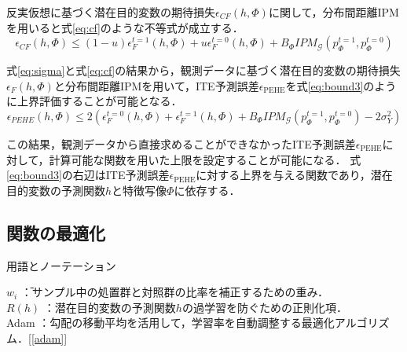 \documentclass[dvipdfmx]{jreport}
\begin{document}
反実仮想に基づく潜在目的変数の期待損失$\epsilon_{CF}(h, \Phi)$に関して，分布間距離IPMを用いると式\eqref{eq:cf}のような不等式が成立する．
\begin{equation}
    \epsilon_{CF}(h, \Phi) \leq (1 - u)\epsilon_F^{t=1}(h, \Phi) + u\epsilon_F^{t=0}(h, \Phi) + B_\Phi IPM_{\mathcal{G}}(p_\Phi^{t=1}, p_\Phi^{t=0}) \label{eq:cf}
\end{equation}


式\eqref{eq:sigma}と式\eqref{eq:cf}の結果から，観測データに基づく潜在目的変数の期待損失$\epsilon_F(h, \Phi)$と分布間距離IPMを用いて，ITE予測誤差$\epsilon_{\text{PEHE}}$を式\eqref{eq:bound3}のように上界評価することが可能となる．
\begin{equation}
    \epsilon_{PEHE}(h, \Phi)
    \leq 2 (\epsilon_F^{t=0}(h, \Phi) + \epsilon_F^{t=1}(h, \Phi) 
    + B_\Phi IPM_{\mathcal{G}}(p_\Phi^{t=1}, p_\Phi^{t=0}) - 2 \sigma_Y^2) \label{eq:bound3} 
\end{equation}

この結果，観測データから直接求めることができなかったITE予測誤差$\epsilon_{\text{PEHE}}$に対して，計算可能な関数を用いた上限を設定することが可能になる．
式\eqref{eq:bound3}の右辺はITE予測誤差$\epsilon_{\text{PEHE}}$に対する上界を与える関数であり，潜在目的変数の予測関数$h$と特徴写像$\Phi$に依存する．



\subsection{関数の最適化}
\begin{itembox}[l]{\large{用語とノーテーション}}
    \begin{tabbing}
        \hspace{15pt} \raisebox{0.5ex}{\tiny $\bullet$} $w_i$ \hspace{14pt}\=：サンプル中の処置群と対照群の比率を補正するための重み．\\[0.5em]
        \hspace{15pt} \raisebox{0.5ex}{\tiny $\bullet$} $R(h)$ \>：潜在目的変数の予測関数$h$の過学習を防ぐための正則化項．\\[0.5em]
        \hspace{15pt} \raisebox{0.5ex}{\tiny $\bullet$} Adam \>：勾配の移動平均を活用して，学習率を自動調整する最適化アルゴリズム．[\ref{adam}]
    \end{tabbing}
\end{itembox}
\end{document}
